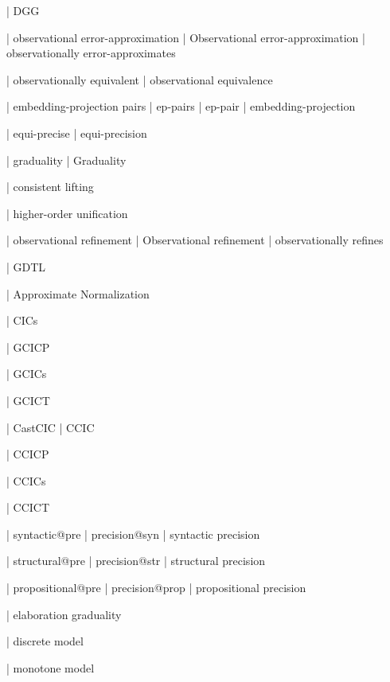   | DGG

  | observational error-approximation
  | Observational error-approximation
  | observationally error-approximates

  | observationally equivalent
  | observational equivalence

  | embedding-projection pairs
  | ep-pairs
  | ep-pair
  | embedding-projection

  | equi-precise
  | equi-precision

  | graduality
  | Graduality

  | consistent lifting

  | higher-order unification

  | observational refinement
  | Observational refinement
  | observationally refines

  | GDTL

  | Approximate Normalization

  | CICs

  | GCICP

  | GCICs

  | GCICT

  | CastCIC
  | CCIC

  | CCICP

  | CCICs

  | CCICT

  | syntactic@pre
  | precision@syn
  | syntactic precision

  | structural@pre
  | precision@str
  | structural precision

  | propositional@pre
  | precision@prop
  | propositional precision






  | elaboration graduality

  | discrete model

  | monotone model